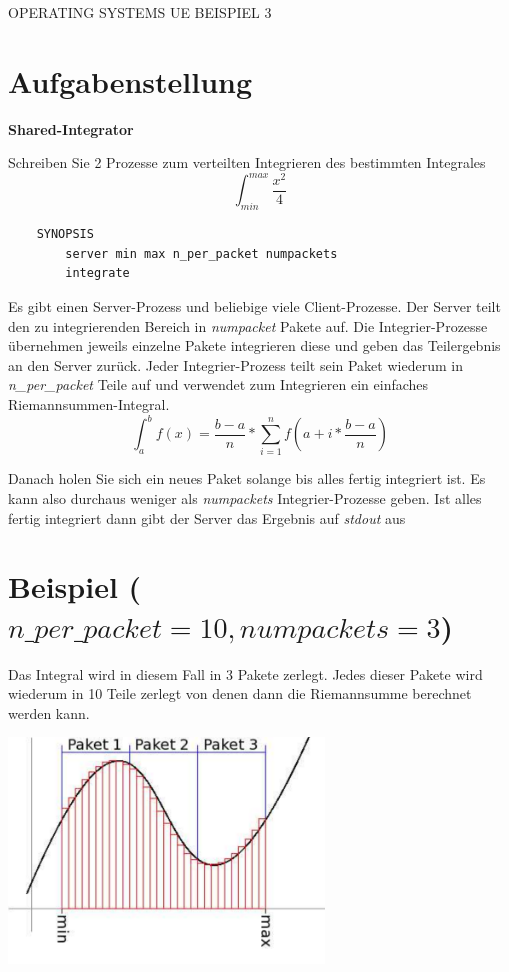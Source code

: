 \documentclass{article}
\begin{document}
\begin{center}
\begin{Large}
OPERATING SYSTEMS UE BEISPIEL 3
\end{Large}
\end{center}
\section*{Aufgabenstellung}

\textbf{Shared-Integrator}

Schreiben Sie 2 Prozesse zum verteilten Integrieren des bestimmten Integrales 
$$\int^{max}_{min} \frac{x^2}{4}$$

\begin{verbatim}
    SYNOPSIS
        server min max n_per_packet numpackets
        integrate 
\end{verbatim}

Es gibt einen Server-Prozess und beliebige viele Client-Prozesse. 
Der Server teilt den zu integrierenden Bereich in \emph{numpacket} Pakete auf. 
Die Integrier-Prozesse übernehmen jeweils einzelne Pakete integrieren diese und geben das Teilergebnis an den Server zurück. 
Jeder Integrier-Prozess teilt sein Paket wiederum in \emph{n\_per\_packet} Teile auf und verwendet zum Integrieren ein einfaches Riemannsummen-Integral.
$$\int^b_a f(x) = \frac{b-a}n * \sum_{i=1}^{n} f(a+i*\frac{b-a}{n})$$

Danach holen Sie sich ein neues Paket solange bis alles fertig integriert ist. Es kann also durchaus weniger als \emph{numpackets} Integrier-Prozesse geben. Ist alles fertig integriert dann gibt der Server das Ergebnis auf \emph{stdout} aus

\section*{Beispiel {\small($n\_per\_packet=10, numpackets=3$)}}
Das Integral wird in diesem Fall in 3 Pakete zerlegt.
Jedes dieser Pakete wird wiederum in 10 Teile zerlegt von denen dann die Riemannsumme berechnet werden kann.

\begin{center}
\includegraphics[height=6cm]{integrate.pdf}
\end{center}
\end{document}
